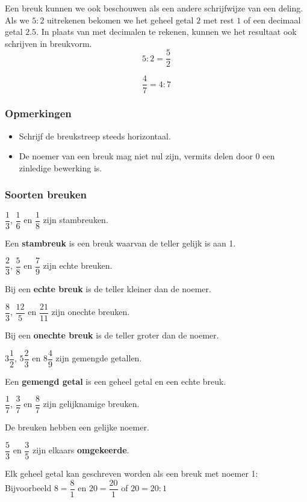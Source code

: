 \documentclass[12pt]{article}
\begin{document}
Een breuk kunnen we ook beschouwen als een andere schrijfwijze van een deling.
Als we $5 : 2$ uitrekenen bekomen we het geheel getal $2$ met rest $1$ of een decimaal getal $2.5$. In plaats van met decimalen te rekenen, kunnen we het resultaat ook schrijven in breukvorm.
$$5 : 2 = \dfrac{5}{2}$$

\begin{voorbeeld}
$$\dfrac{4}{7}=4:7$$
\end{voorbeeld}

\subsubsection*{Opmerkingen}
\begin{itemize}
  \item Schrijf de breukstreep steeds horizontaal.
  \item De noemer van een breuk mag niet nul zijn, vermits delen door 0 een zinledige bewerking is.
\end{itemize}

\subsubsection{Soorten breuken}

$\dfrac{1}{3}$, $\dfrac{1}{6}$ en $\dfrac{1}{8}$ zijn stambreuken.

Een {\bf stambreuk} is een breuk waarvan de teller gelijk is aan 1.

$\dfrac{2}{3}$, $\dfrac{5}{8}$ en $\dfrac{7}{9}$ zijn echte breuken.

Bij een {\bf echte breuk} is de teller kleiner dan de noemer.

$\dfrac{8}{3}$, $\dfrac{12}{5}$ en $\dfrac{21}{11}$ zijn onechte breuken.

Bij een {\bf onechte breuk} is de teller groter dan de noemer.

$3\dfrac{1}{2}$, $5\dfrac{2}{3}$ en $8\dfrac{4}{9}$ zijn gemengde getallen.

Een {\bf gemengd getal} is een geheel getal en een echte breuk.

$\dfrac{1}{7}$, $\dfrac{3}{7}$ en $\dfrac{8}{7}$ zijn gelijknamige breuken.

De breuken hebben een gelijke noemer.

$\dfrac{5}{3}$ en $\dfrac{3}{5}$ zijn elkaars {\bf omgekeerde}.

Elk geheel getal kan geschreven worden als een breuk met noemer 1:\\
Bijvoorbeeld $8=\dfrac{8}{1}$ en $20=\dfrac{20}{1}$ of $20=20:1$
\end{document}
